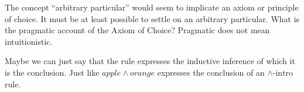 The concept ``arbitrary particular'' would seem to implicate an axiom
or principle of choice. It must be at least possible to settle on an
arbitrary particular. What is the pragmatic account of the Axiom of
Choice? Pragmatic does not mean intuitionistic.

Maybe we can just say that the rule
expresses the inductive inference of which it is the conclusion. Just
like \(apple\land orange\) expresses the conclusion of an
\(\land\scriptstyle{\text{-intro}}\) rule.









